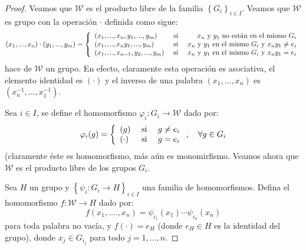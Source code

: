 \documentclass[12pt]{report}
\theoremstyle{largebreak}
\newcommand\cf[3]{\ensuremath{#1:#2\rightarrow#3}}
\begin{document}
    \begin{proof}
        Veamos que $\mathscr{W}$ es el producto libre de la familia $\left\{G_i \right\}_{ i\in I}$. Veamos que $\mathscr{W}$ es grupo con la operación $\cdot$ definida como sigue:
        \begin{equation*}
            (x_1,...,x_n)\cdot(y_1,...,y_m)=\left\{
                \begin{array}{lcr}
                    (x_1,...,x_n,y_1,...,y_m) & \textup{ si } & x_n\textup{ y }y_1\textup{ no están en el mismo }G_i\\
                    (x_1,...,x_ny_1,...,y_m) & \textup{ si } & x_n\textup{ y }y_1\textup{ en el mismo }G_i\textup{ y }x_ny_1\neq e_i\\
                    (x_1,...,x_{ n-1},y_2,...,y_m) & \textup{ si } & x_n\textup{ y }y_1\textup{ en el mismo }G_i\textup{ y }x_ny_1= e_i\\
                \end{array}
            \right.
        \end{equation*}
        hace de $\mathscr{W}$ un grupo. En efecto, claramente esta operación es asociativa, el elemento identidad es $(\cdot)$ y el inverso de una palabra $(x_1,...,x_n)$ es $(x_n^{-1},...,x_1^{-1})$.

        Sea $i\in I$, se define el homomorfismo $\cf{\varphi_i}{G_i}{\mathscr{W}}$ dado por:
        \begin{equation*}
            \varphi_i(g)=\left\{
                \begin{array}{lcr}
                    (g) & \textup{ si } & g\neq e_i\\
                    (\cdot) & \textup{ si } & g= e_i\\
                \end{array}
            \right.,\quad\forall g\in G_i
        \end{equation*}
        (claramente éste es homomorfismo, más aún es monomirfismo. Veamos ahora que $\mathscr{W}$ es el producto libre de los grupos $G_i$.

        Sea $H$ un grupo y $\left\{\cf{\psi_i}{G_i}{H} \right\}_{ i\in I}$ una familia de homomorfismos. Defina el homomorfismo $\cf{f}{\mathscr{W}}{H}$ dado por:
        \begin{equation*}
            f(x_1,....,x_n)=\psi_{i_1}(x_1)\cdots\psi_{i_n}(x_n)
        \end{equation*}
        para toda palabra no vacía, y $f(\cdot)=e_H$ (donde $e_H\in H$ es la identidad del grupo), donde $x_j\in G_{i_j}$ para todo $j=1,...,n$.
        

\end{proof}
\end{document}
